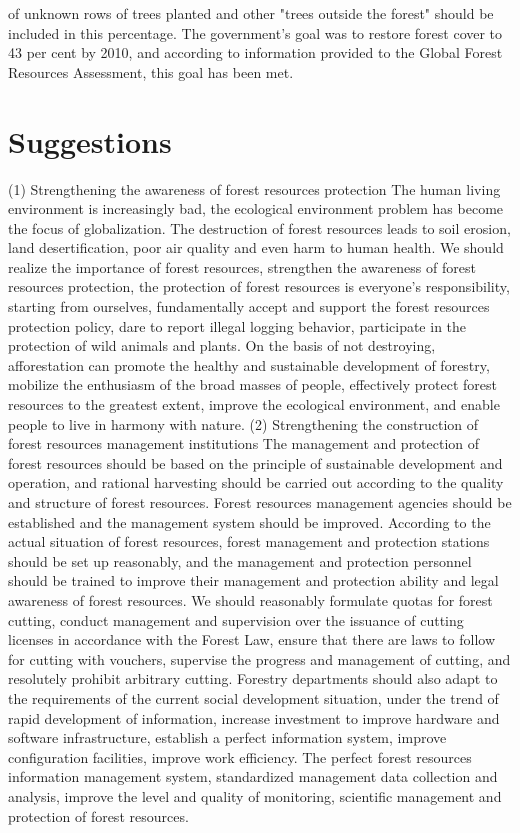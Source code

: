 \documentclass{book}\usepackage{knitr}
\begin{document}
\begin{knitrout}
\begin{kframe}
of unknown rows of trees planted and other "trees outside the forest" should be included in this percentage. The government's goal was to restore forest cover to 43 per cent by 2010, and according to information provided to the Global Forest Resources Assessment, this goal has been met.

\section{Suggestions}
(1) Strengthening the awareness of forest resources protection
The human living environment is increasingly bad, the ecological environment problem has become the focus of globalization. The destruction of forest resources leads to soil erosion, land desertification, poor air quality and even harm to human health. We should realize the importance of forest resources, strengthen the awareness of forest resources protection, the protection of forest resources is everyone's responsibility, starting from ourselves, fundamentally accept and support the forest resources protection policy, dare to report illegal logging behavior, participate in the protection of wild animals and plants. On the basis of not destroying, afforestation can promote the healthy and sustainable development of forestry, mobilize the enthusiasm of the broad masses of people, effectively protect forest resources to the greatest extent, improve the ecological environment, and enable people to live in harmony with nature.
(2) Strengthening the construction of forest resources management institutions
The management and protection of forest resources should be based on the principle of sustainable development and operation, and rational harvesting should be carried out according to the quality and structure of forest resources. Forest resources management agencies should be established and the management system should be improved. According to the actual situation of forest resources, forest management and protection stations should be set up reasonably, and the management and protection personnel should be trained to improve their management and protection ability and legal awareness of forest resources. We should reasonably formulate quotas for forest cutting, conduct management and supervision over the issuance of cutting licenses in accordance with the Forest Law, ensure that there are laws to follow for cutting with vouchers, supervise the progress and management of cutting, and resolutely prohibit arbitrary cutting. Forestry departments should also adapt to the requirements of the current social development situation, under the trend of rapid development of information, increase investment to improve hardware and software infrastructure, establish a perfect information system, improve configuration facilities, improve work efficiency. The perfect forest resources information management system, standardized management data collection and analysis, improve the level and quality of monitoring, scientific management and protection of forest resources.

\end{kframe}
\end{knitrout}
\end{document}

